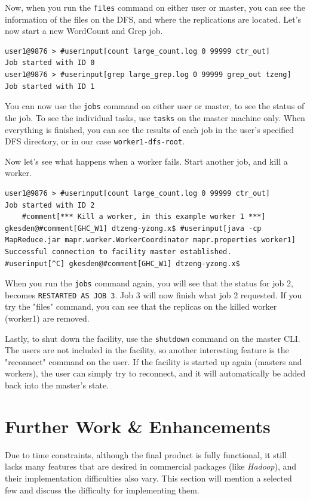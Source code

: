 \documentclass{article} %
\begin{document}
\par\qquad Now, when you run the \texttt{files} command on either user or master, you can see the information of the files on the DFS, and where the replications are located.  Let's now start a new WordCount and Grep job.
\begin{Verbatim}[commandchars=\#\[\]]
user1@9876 > #userinput[count large_count.log 0 99999 ctr_out]
Job started with ID 0
user1@9876 > #userinput[grep large_grep.log 0 99999 grep_out tzeng]
Job started with ID 1
\end{Verbatim}
You can now use the \texttt{jobs} command on either user or master, to see the status of the job.  To see the individual tasks, use \texttt{tasks} on the master machine only.  When everything is finished, you can see the results of each job in the user's specified DFS directory, or in our case \texttt{worker1-dfs-root}.

\par Now let's see what happens when a worker fails.  Start another job, and kill a worker.
\begin{Verbatim}[fontsize=\scriptsize, xleftmargin=-.2in,commandchars=\#\[\]]
user1@9876 > #userinput[count large_count.log 0 99999 ctr_out]
Job started with ID 2
	#comment[*** Kill a worker, in this example worker 1 ***]
gkesden@#comment[GHC_W1] dtzeng-yzong.x$ #userinput[java -cp MapReduce.jar mapr.worker.WorkerCoordinator mapr.properties worker1]
Successful connection to facility master established.
#userinput[^C] gkesden@#comment[GHC_W1] dtzeng-yzong.x$
\end{Verbatim}
When you run the \texttt{jobs} command again, you will see that the status for job 2, becomes \texttt{RESTARTED AS JOB 3}.  Job 3 will now finish what job 2 requested.  If you try the "files" command, you can see that the replicas on the killed worker (worker1) are removed.
\par\qquad Lastly, to shut down the facility, use the \texttt{shutdown} command on the master CLI.  The users are not included in the facility, so another interesting feature is the "reconnect" command on the user.  If the facility is started up again (masters and workers), the user can simply try to reconnect, and it will automatically be added back into the master's state.

\section{Further Work \& Enhancements}

\par\qquad Due to time constraints, although the final product is fully functional, it still lacks many features that are desired in commercial packages (like \emph{Hadoop}), and their implementation difficulties also vary. This section will mention a selected few and discuss the difficulty for implementing them.
\end{document}
